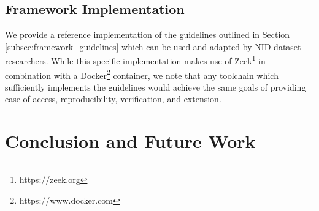 \documentclass[conference]{IEEEtran}
\begin{document}
\subsection{Framework Implementation}\label{subsec:framework_implementation}
We provide a reference implementation of the guidelines outlined in Section \ref{subsec:framework_guidelines} which can be used and adapted by NID dataset researchers.
While this specific implementation makes use of Zeek\footnote{https://zeek.org} in combination with a Docker\footnote{https://www.docker.com} container, we note that any toolchain which sufficiently implements the guidelines would achieve the same goals of providing ease of access, reproducibility, verification, and extension.

\section{Conclusion and Future Work}\label{sec:conclusion}



\end{document}
